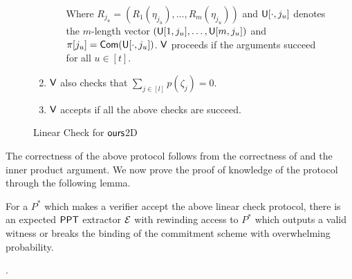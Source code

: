 \begin{figure}[h!]
\begin{framed}
\begin{enumerate}[{\rm 1.}]
\begin{itemize}
				Where $R_{j_u} = (R_1( \eta_{j_u}) , \ldots , R_m( \eta_{j_u}))$ and $\mathsf{U}[\cdot,j_u]$ denotes the $m$-length vector $(\mathsf{U}[1,j_u], \ldots, \mathsf{U}[m,j_u])$ and $\pi[j_u] = \mathsf{Com}(\mathsf{U}[\cdot, j_u])$. $\mathsf{V}$ proceeds if the arguments succeed for all $u \in [t]$.
			\end{itemize} 
			
			\item $\mathsf{V}$ also checks that $\sum_{j\in[l]} p(\zeta_j)=0$.
			
			\item $\mathsf{V}$ accepts if all the above checks are succeed.	  
		\end{enumerate}
	\end{framed}
	\caption{Linear Check for $\textsf{ours}$2D}
\end{figure}
The correctness of the above protocol follows from the correctness of \cite{ligero} and the inner product argument. We now prove the proof of knowledge of the protocol through the following lemma.
\begin{lemma}
	For a $P^*$ which makes a verifier accept the above linear check protocol, there is an expected $\mathsf{PPT}$ extractor $\mathcal{E}$ with rewinding access to $P^*$ which outputs a valid witness or breaks the binding of the commitment scheme with overwhelming probability.
\end{lemma}
.

